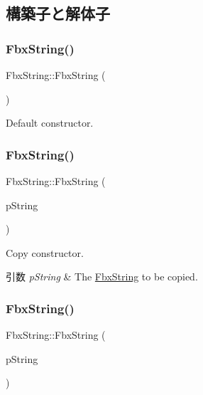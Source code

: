 \subsection{構築子と解体子}
\mbox{\label{class_fbx_string_af7a39b49d5e2238203b42c830a6a28f3}} 
\subsubsection{\texorpdfstring{Fbx\+String()}{FbxString()}\hspace{0.1cm}{\footnotesize\ttfamily [1/8]}}
{\footnotesize\ttfamily Fbx\+String\+::\+Fbx\+String (\begin{DoxyParamCaption}{ }\end{DoxyParamCaption})}



Default constructor. 

\mbox{\label{class_fbx_string_a7d4974cb96793041faf74947ddebd4ce}} 
\subsubsection{\texorpdfstring{Fbx\+String()}{FbxString()}\hspace{0.1cm}{\footnotesize\ttfamily [2/8]}}
{\footnotesize\ttfamily Fbx\+String\+::\+Fbx\+String (\begin{DoxyParamCaption}\item[{const \hyperlink{class_fbx_string}{Fbx\+String} \&}]{p\+String }\end{DoxyParamCaption})}

Copy constructor. 
\begin{DoxyParams}{引数}
{\em p\+String} & The \hyperlink{class_fbx_string}{Fbx\+String} to be copied. \\
\hline
\end{DoxyParams}
\mbox{\label{class_fbx_string_ac13dc02cce30f3c297a7f38019dc38ab}} 
\subsubsection{\texorpdfstring{Fbx\+String()}{FbxString()}\hspace{0.1cm}{\footnotesize\ttfamily [3/8]}}
{\footnotesize\ttfamily Fbx\+String\+::\+Fbx\+String (\begin{DoxyParamCaption}\item[{const char $\ast$}]{p\+String }\end{DoxyParamCaption})}

